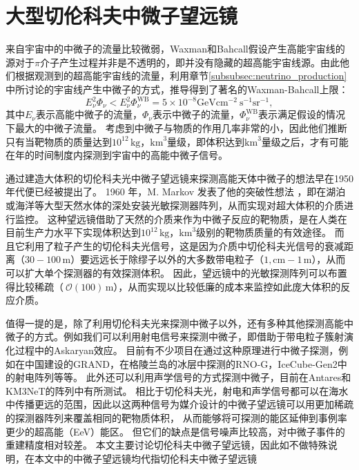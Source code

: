 \chapter{大型切伦科夫中微子望远镜}
\label{ch:neutrino_telescope}

来自宇宙中的中微子的流量比较微弱，Waxman和Bahcall假设产生高能宇宙线的源对于$\pi$介子产生过程并非是不透明的，即并没有隐藏的超高能宇宙线源。由此他们根据观测到的超高能宇宙线的流量，利用章节\ref{subsubsec:neutrino_production}中所讨论的宇宙线产生中微子的方式，推导得到了著名的Waxman-Bahcall上限\cite{Waxman_Bahcall_bound:1999, Waxman_Bahcall_bound:2001}：
\begin{equation}
    E_\nu^2 \Phi_\nu < E_\nu^2 \Phi_\nu^{\mathrm{WB}} = 5 \times 10^{-8} \mathrm{GeV} \mathrm{cm}^{-2} \mathrm{~s}^{-1} \mathrm{sr}^{-1} ,
    \label{eq:Waxman_Bahcall_bound}
\end{equation}
其中$E_\nu$表示高能中微子的流量，$\Phi_\nu$表示中微子的流量，$\Phi_\nu^{\mathrm{WB}}$表示满足假设的情况下最大的中微子流量。
考虑到中微子与物质的作用几率非常的小，因此他们推断只有当靶物质的质量达到$10^{12}\,\mathrm{kg}$，$\mathrm{km}^3$量级，即体积达到$\mathrm{km}^3$量级之后，才有可能在年的时间制度内探测到宇宙中的高能中微子信号。

通过建造大体积的切伦科夫光中微子望远镜来探测高能天体中微子的想法早在1950年代便已经被提出了\cite{Telescope_history:2019}。
1960 年，M. Markov 发表了他的突破性想法 \cite{Markov:1960}，即在湖泊或海洋等大型天然水体的深处安装光敏探测器阵列，从而实现对超大体积的介质进行监控。
这种望远镜借助了天然的介质来作为中微子反应的靶物质，是在人类在目前生产力水平下实现体积达到$10^{12}\,\mathrm{kg}$，$\mathrm{km}^3$级别的靶物质质量的有效途径。
而且它利用了粒子产生的切伦科夫光信号，这是因为介质中切伦科夫光信号的衰减距离（$30-100\,\mathrm{m}$）要远远长于除缪子以外的大多数带电粒子（$1,\mathrm{cm}-1\,\mathrm{m}$），从而可以扩大单个探测器的有效探测体积。
因此，望远镜中的光敏探测阵列可以布置得比较稀疏（$~\mathcal{O}(100)\,\mathrm{m}$），从而实现以比较低廉的成本来监控如此庞大体积的反应介质。

值得一提的是，除了利用切伦科夫光来探测中微子以外，还有多种其他探测高能中微子的方式。例如我们可以利用射电信号来探测中微子，即借助于带电粒子簇射演化过程中的Askaryan效应\cite{askaryan_excess:1962}。
目前有不少项目在通过这种原理进行中微子探测，例如在中国建设的GRAND\cite{GRAND:2018}，在格陵兰岛的冰层中探测的RNO-G\cite{RNO-G:2020}，IceCube-Gen2中的射电阵列\cite{IceCube-Gen2_white_paper:2020}等等。
此外还可以利用声学信号的方式探测中微子\cite{Askarian_acoustic:1979}，目前在Antares和KM3NeT的阵列中有所测试\cite{Lahmann_history_acoustic:2019, ANTARES_acoustic:2010, KM3NeT_acoustic:2022}。
相比于切伦科夫光，射电和声学信号都可以在海水中传播更远的范围，因此以这两种信号为媒介设计的中微子望远镜可以用更加稀疏的探测器阵列来覆盖相同的靶物质体积， 从而能够将可探测的能区延伸到事例率更少的超高能（EeV）能区。
但它们的缺点是信号噪声比较高，对中微子事件的重建精度相对较差。
本文主要讨论切伦科夫中微子望远镜，因此如不做特殊说明，在本文中的中微子望远镜均代指切伦科夫中微子望远镜


